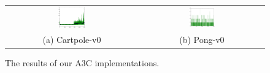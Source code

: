 \begin{figure}[h!]
\centering
\begin{tabular}{c c}
\includegraphics[width=0.22\textwidth]{./fig/myA3C_cartpole_rewardsplot.png} &
\includegraphics[width=0.22\textwidth]{./fig/myA3C_pong_rewardsplot.png}\\
(a) Cartpole-v0 & (b) Pong-v0  \\
\end{tabular}
\caption{The results of our A3C implementations.}
\label{fig:A3C_baselines}
\end{figure}







